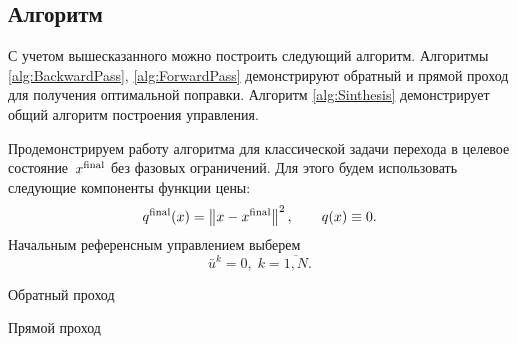 \documentclass[../../doc.tex]{subfiles}
\begin{document}
    \subsection{Алгоритм}
    С учетом вышесказанного можно построить следующий алгоритм.
    Алгоритмы \ref{alg:BackwardPass}, \ref{alg:ForwardPass} демонстрируют обратный и прямой проход для получения оптимальной поправки.
    Алгоритм \ref{alg:Sinthesis} демонстрирует общий алгоритм построения управления.

    Продемонстрируем работу алгоритма для классической задачи перехода в целевое состояние~$x^{\textnormal{final}}$ без фазовых ограничений.
    Для этого будем использовать следующие компоненты функции цены:
    \begin{equation}\label{eq:ilqr-algo:cost}
        q^{\textnormal{final}}(x) = \left\|x - x^{\textnormal{final}}\right\|^2,
        \qquad
        q(x) \equiv 0.
    \end{equation}
    Начальным референсным управлением выберем
    \begin{equation}\label{eq:ilqr-algo:ref-control}
        \bar u^k = 0,\; k = \overline{1, N}.
    \end{equation}
    
    \begin{rusalgorithm}\caption{Обратный проход}\label{alg:BackwardPass}
        \DontPrintSemicolon
    \end{rusalgorithm}
    \begin{rusalgorithm}\caption{Прямой проход}\label{alg:ForwardPass}
        \DontPrintSemicolon
    \end{rusalgorithm}
    
\end{document}
